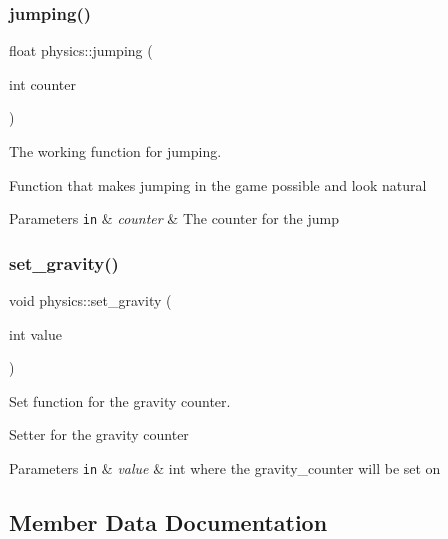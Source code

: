 \subsubsection{\texorpdfstring{jumping()}{jumping()}}
{\footnotesize\ttfamily float physics\+::jumping (\begin{DoxyParamCaption}\item[{int}]{counter }\end{DoxyParamCaption})}



The working function for jumping. 

Function that makes jumping in the game possible and look natural


\begin{DoxyParams}[1]{Parameters}
\mbox{\tt in}  & {\em counter} & The counter for the jump \\
\hline
\end{DoxyParams}
\mbox{\label{classphysics_a8b0dff646c304dee3cb5c095d821dc87}} 
\subsubsection{\texorpdfstring{set\+\_\+gravity()}{set\_gravity()}}
{\footnotesize\ttfamily void physics\+::set\+\_\+gravity (\begin{DoxyParamCaption}\item[{int}]{value }\end{DoxyParamCaption})}



Set function for the gravity counter. 

Setter for the gravity counter 
\begin{DoxyParams}[1]{Parameters}
\mbox{\tt in}  & {\em value} & int where the gravity\+\_\+counter will be set on \\
\hline
\end{DoxyParams}


\subsection{Member Data Documentation}
\mbox{\label{classphysics_a49345e47dcf7f97b9e1c20ba622cf5e4}} 
